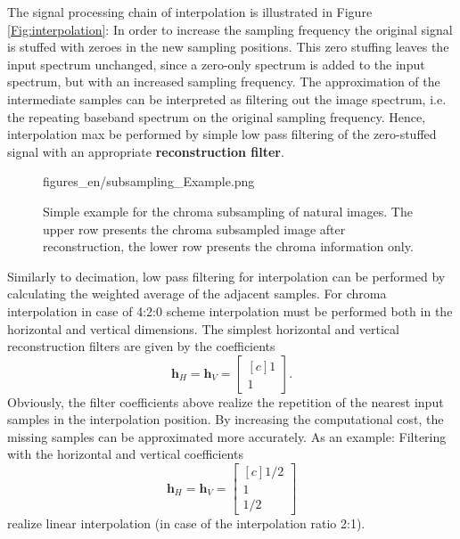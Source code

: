 The signal processing chain of interpolation is illustrated in Figure \ref{Fig:interpolation}:
In order to increase the sampling frequency the original signal is stuffed with zeroes in the new sampling positions.
This zero stuffing leaves the input spectrum unchanged, since a zero-only spectrum is added to the input spectrum, but with an increased sampling frequency.
The approximation of the intermediate samples can be interpreted as filtering out the image spectrum, i.e. the repeating baseband spectrum on the original sampling frequency.
Hence, interpolation max be performed by simple low pass filtering of the zero-stuffed signal with an appropriate \textbf{reconstruction filter}.

\begin{figure}[t!]
	\centering
	\begin{overpic}[width = 0.8\columnwidth]{figures_en/subsampling_Example.png}
 	\end{overpic}
	\caption{Simple example for the chroma subsampling of natural images.
	The upper row presents the chroma subsampled image after reconstruction, the lower row presents the chroma information only.}
	\label{Fig:chroma_subsampling_Ex}
\end{figure}

Similarly to decimation, low pass filtering for interpolation can be performed by calculating the weighted average of the adjacent samples.
For chroma interpolation in case of 4:2:0 scheme interpolation must be performed both in the horizontal and vertical dimensions.
The simplest horizontal and vertical reconstruction filters are given by the coefficients
\begin{equation}
\mathbf{h}_H =
\mathbf{h}_V =
\begin{bmatrix}[c]
       1 \\[0.3em]
       1\end{bmatrix}.
\end{equation}
Obviously, the filter coefficients above realize the repetition of the nearest input samples in the interpolation position.
By increasing the computational cost, the missing samples can be approximated more accurately.
As an example: Filtering with the horizontal and vertical coefficients
\begin{equation}
\mathbf{h}_H =
\mathbf{h}_V =
\begin{bmatrix}[c]
       1/2 \\[0.3em]
       1 \\[0.3em]
       1/2 \end{bmatrix}
\end{equation}
realize linear interpolation (in case of the interpolation ratio 2:1). 

